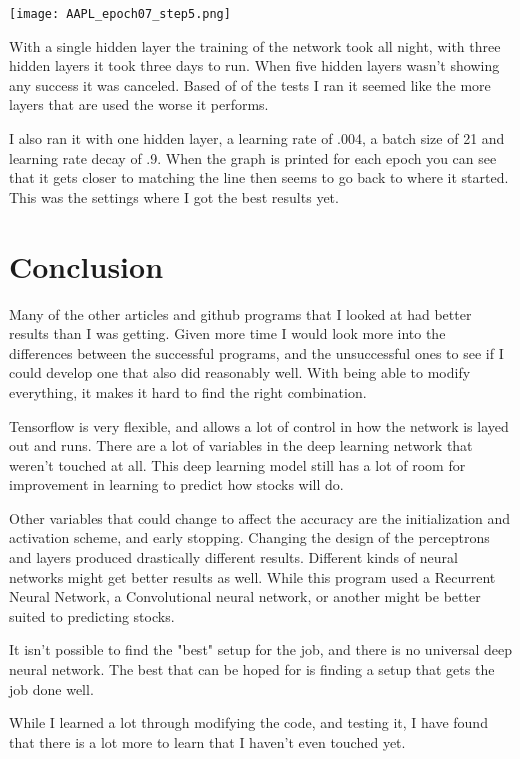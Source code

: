 \documentclass{article}
\begin{document}
\texttt{[image: AAPL\_epoch07\_step5.png]}

With a single hidden layer the training of the network took all night, with three hidden layers it took three days to run. 
When five hidden layers wasn't showing any success it was canceled. 
Based of of the tests I ran it seemed like the more layers that are used the worse it performs.

I also ran it with one hidden layer, a learning rate of .004, a batch size of 21 and learning rate decay of .9.
When the graph is printed for each epoch you can see that it gets closer to matching the line then seems to go back to where it started.
This was the settings where I got the best results yet.


\section{Conclusion}

Many of the other articles and github programs that I looked at had better results than I was getting.
Given more time I would look more into the differences between the successful programs, and the unsuccessful ones to see if I could develop one that also did reasonably well. 
With being able to modify everything, it makes it hard to find the right combination.


Tensorflow is very flexible, and allows a lot of control in how the network is layed out and runs.
There are a lot of variables in the deep learning network that weren't touched at all. 
This deep learning model still has a lot of room for improvement in learning to predict how stocks will do.

Other variables that could change to affect the accuracy are the initialization and activation scheme, and early stopping.
Changing the design of the perceptrons and layers produced drastically different results. 
Different kinds of neural networks might get better results as well.
While this program used a Recurrent Neural Network, a Convolutional neural network, or another might be better suited to predicting stocks. 

It isn't possible to find the "best" setup for the job, and there is no universal deep neural network.
The best that can be hoped for is finding a setup that gets the job done well.

While I learned a lot through modifying the code, and testing it, I have found that there is a lot more to learn that I haven't even touched yet. 
\end{document}
